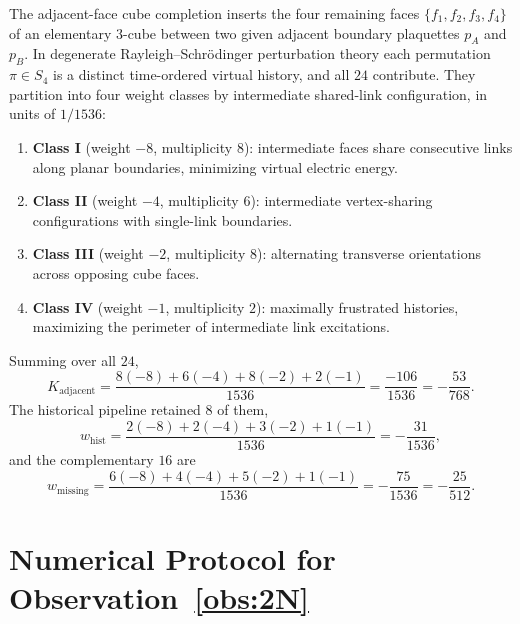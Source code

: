 \documentclass[11pt,a4paper]{article}
\theoremstyle{definition}
\begin{document}
The adjacent-face cube completion inserts the four remaining faces $\{f_1,f_2,f_3,f_4\}$ of an elementary $3$-cube between two given adjacent boundary plaquettes $p_A$ and $p_B$. In degenerate Rayleigh--Schr\"odinger perturbation theory each permutation $\pi\in S_4$ is a distinct time-ordered virtual history, and all $24$ contribute. They partition into four weight classes by intermediate shared-link configuration, in units of $1/1536$:
\begin{enumerate}\itemsep2pt
  \item \textbf{Class I} (weight $-8$, multiplicity $8$): intermediate faces share consecutive links along planar boundaries, minimizing virtual electric energy.
  \item \textbf{Class II} (weight $-4$, multiplicity $6$): intermediate vertex-sharing configurations with single-link boundaries.
  \item \textbf{Class III} (weight $-2$, multiplicity $8$): alternating transverse orientations across opposing cube faces.
  \item \textbf{Class IV} (weight $-1$, multiplicity $2$): maximally frustrated histories, maximizing the perimeter of intermediate link excitations.
\end{enumerate}
Summing over all $24$,
\begin{equation}
  K_{\mathrm{adjacent}} = \frac{8(-8) + 6(-4) + 8(-2) + 2(-1)}{1536} = \frac{-106}{1536} = -\frac{53}{768}.
\end{equation}
The historical pipeline retained $8$ of them,
\begin{equation}
  w_{\mathrm{hist}} = \frac{2(-8) + 2(-4) + 3(-2) + 1(-1)}{1536} = -\frac{31}{1536},
\end{equation}
and the complementary $16$ are
\begin{equation}
  w_{\mathrm{missing}} = \frac{6(-8) + 4(-4) + 5(-2) + 1(-1)}{1536} = -\frac{75}{1536} = -\frac{25}{512}.
\end{equation}

\section{Numerical Protocol for Observation~\ref{obs:2N}}\label{app:numerics}
\end{document}
